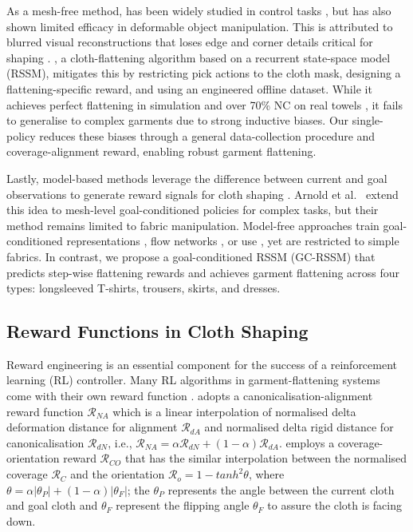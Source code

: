 \documentclass[journal]{IEEEtran}
\begin{document}
As a mesh-free method,  \cite{hafner2019learning} has been widely studied in control tasks \cite{yan2021learning, ma2021learning, lin2020softgym}, but has also shown limited efficacy in deformable object manipulation. This is attributed to blurred visual reconstructions that loses edge and corner details critical for shaping \cite{yan2021learning, hoque2022visuospatial, lin2022learning}.  \cite{kadi2024planet}, a cloth-flattening algorithm based on a recurrent state-space model (RSSM), mitigates this by restricting pick actions to the cloth mask, designing a flattening-specific reward, and using an engineered offline dataset. While it achieves perfect flattening in simulation and over 70\% NC on real towels \cite{kadi2024planet, kadi2025draper}, it fails to generalise to complex garments due to strong inductive biases. Our single-policy  reduces these biases through a general data-collection procedure and coverage-alignment reward, enabling robust garment flattening.

Lastly, model-based methods leverage the difference between current and goal observations to generate reward signals for cloth shaping \cite{hoque2022visuospatial, yan2021learning}. Arnold et al.~\cite{arnold2023cloth} extend this idea to mesh-level goal-conditioned policies for complex tasks, but their method remains limited to fabric manipulation. Model-free approaches train goal-conditioned representations \cite{mo2022foldsformer}, flow networks \cite{weng2022fabricflownet}, or use  \cite{andrychowicz2017hindsight, lee2021learning}, yet are restricted to simple fabrics. In contrast, we propose a goal-conditioned RSSM (GC-RSSM) that predicts step-wise flattening rewards and achieves garment flattening across four types: longsleeved T-shirts, trousers, skirts, and dresses.




\subsection{Reward Functions in Cloth Shaping} \label{sec:reward-literature}
Reward engineering is an essential component for the success of a reinforcement learning (RL) controller. Many RL algorithms in garment-flattening systems come with their own reward function \cite{canberk2023cloth, gu2023learning, avigal2022speedfolding}.  \cite{canberk2023cloth} adopts a canonicalisation-alignment reward  function $\mathcal{R}_{NA}$  which is a linear interpolation of normalised delta deformation distance for alignment $\mathcal{R}_{dA}$ and normalised delta rigid distance for canonicalisation $\mathcal{R}_{dN}$, i.e., $\mathcal{R}_{NA} = \alpha\mathcal{R}_{dN} + (1-\alpha)\mathcal{R}_{dA}$.  \cite{gu2023learning} employs a coverage-orientation reward $\mathcal{R}_{CO}$ that has the similar interpolation between the normalised coverage $\mathcal{R}_C$ and the orientation $\mathcal{R}_o = 1 - tanh^2\theta$, where $\theta = \alpha|\theta_P| + (1-\alpha)|\theta_F|$; the $\theta_P$ represents the angle between the current cloth and goal cloth and $\theta_F$ represent the flipping angle $\theta_F$ to assure the cloth is facing down. 
\end{document}
